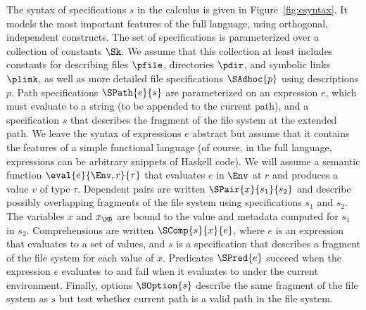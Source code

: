 The syntax of specifications $s$ in the \forest{} calculus is given in
Figure~\ref{fig:csyntax}. It models the most important features of the
full \forest{} language, using orthogonal, independent constructs. The
set of specifications is parameterized over a collection of constants
$\Sk$. We assume that this collection at least includes constants for
describing files $\pfile$, directories $\pdir$, and symbolic links
$\plink$, as well as more detailed file specifications $\SAdhoc{p}$
using \padshaskell{} descriptions $p$. Path specifications
$\SPath{e}{s}$ are parameterized on an expression $e$, which must
evaluate to a string (to be appended to the current path), and a
specification $s$ that describes the fragment of the file system at
the extended path. We leave the syntax of expressions $e$ abstract but
assume that it contains the features of a simple functional language
(of course, in the full \forest{} language, expressions can be
arbitrary snippets of Haskell code). We will assume a semantic
function $\eval{e}{\Env,r}{\tau}$ that evaluates $e$ in $\Env$ at $r$
and produces a value $v$ of type $\tau$. Dependent pairs are written
$\SPair{x}{s_1}{s_2}$ and describe possibly overlapping fragments of
the file system using specifications $s_1$ and $s_2$. The variables
$x$ and $x_{\MD}$ are bound to the value and metadata computed for
$s_1$ in $s_2$. Comprehensions are written $\SComp{s}{x}{e}$, where
$e$ is an expression that evaluates to a set of values, and $s$ is a
specification that describes a fragment of the file system for each
value of $x$.  Predicates $\SPred{e}$ succeed when the expression $e$
evaluates to \True{} and fail when it evaluates to \False{} under the
current environment.  Finally, options $\SOption{s}$ describe the same
fragment of the file system as $s$ but test whether current path is a
valid path in the file system.

